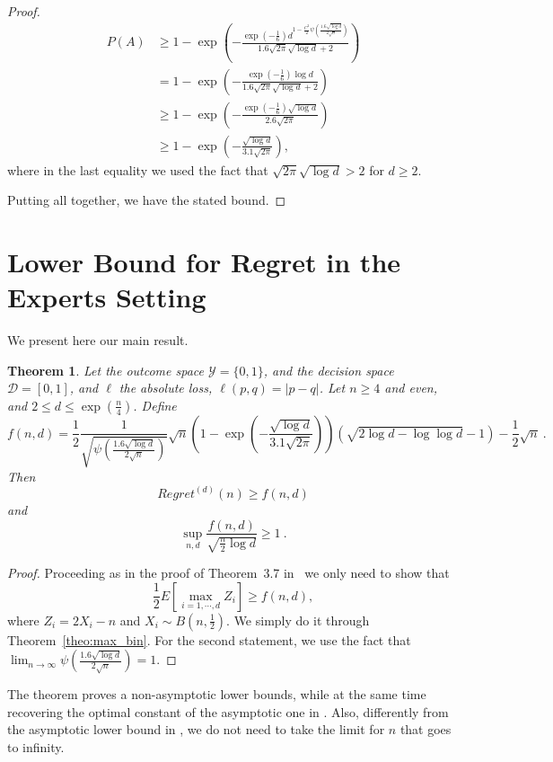 \documentclass{article}
\newtheorem{theorem}{Theorem}
\begin{document}
\begin{proof}
\begin{align*}
P(A)
& \geq 1 - \exp\left(-\frac{\exp\left(-\frac{1}{6}\right) d^{1-\frac{C^2}{2} \psi\left(\frac{1.6 \sqrt{\log d}}{2 \sqrt{n}}\right)}}{1.6 \sqrt{2\pi} \sqrt{\log d}+2}\right) \\
& = 1 - \exp\left(-\frac{\exp\left(-\frac{1}{6}\right) \log d}{1.6 \sqrt{2\pi} \sqrt{\log d}+2}\right) \\
& \geq 1 - \exp\left(-\frac{\exp\left(-\frac{1}{6}\right) \sqrt{\log d}}{2.6 \sqrt{2\pi}}\right)\\
& \geq 1 - \exp\left(-\frac{\sqrt{\log d}}{3.1 \sqrt{2\pi}}\right),
\end{align*}
where in the last equality we used the fact that $\sqrt{2\pi} \sqrt{\log d} > 2$ for $d\geq 2$.

Putting all together, we have the stated bound.
\end{proof}

\section{Lower Bound for Regret in the Experts Setting}
\label{section:experts}

We present here our main result.

\begin{theorem}
Let the outcome space $\mathcal{Y}=\{0,1\}$, and the decision space $\mathcal{D}=[0,1]$, and $\ell$ the absolute loss, $\ell(p,q)=|p-q|$. Let $n\geq4$ and even, and $2\leq d \leq \exp(\frac{n}{4})$.
Define
\[
f(n,d)=\frac{1}{2}\frac{1}{\sqrt{\psi\left(\frac{1.6 \sqrt{\log d}}{2 \sqrt{n}}\right)}}\sqrt{n}\left(1 - \exp\left(-\frac{\sqrt{\log d}}{3.1 \sqrt{2\pi}}\right)\right) \left(\sqrt{2 \log d -\log \log d}-1\right) -\frac{1}{2}\sqrt{n}~.
\]
Then
\[
Regret^{(d)}(n)\geq f(n,d)
\]
and
\[
\sup_{n,d} \frac{f(n,d)}{\sqrt{\frac{n}{2} \log d}} \geq 1~.
\]
\end{theorem}
%
\begin{proof}
Proceeding as in the proof of Theorem~3.7 in~\citep{Cesa-BianchiL06} we only need to show that
\[
\frac{1}{2} E\left[ \max_{i=1,\cdots,d} Z_i\right] \geq f(n,d),
\]
where $Z_i= 2 X_i - n$ and $X_i \sim B(n, \frac{1}{2})$. We simply do it through Theorem~\ref{theo:max_bin}.
For the second statement, we use the fact that $\lim_{n\rightarrow\infty} \psi\left(\frac{1.6 \sqrt{\log d}}{2 \sqrt{n}}\right) = 1$.
\end{proof}

The theorem proves a non-asymptotic lower bounds, while at the same time recovering the optimal constant of the asymptotic one in \citet{Cesa-BianchiL06}. Also, differently from the asymptotic lower bound in \citet{Cesa-BianchiL06}, we do not need to take the limit for $n$ that goes to infinity.
\end{document}
